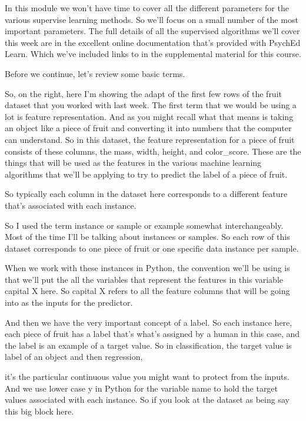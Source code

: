 \begin{multicols}{2}
In this module we won't have time to cover all the different parameters for the various supervise learning methods. So we'll focus on a small number of the most important parameters. The full details of all the supervised algorithms we'll cover this week are in the excellent online documentation that's provided with PsychEd Learn. Which we've included links to in the supplemental material for this course. 

Before we continue, let's review some basic terms. 

So, on the right, here I'm showing the adapt of the first few rows of the fruit dataset that you worked with last week. The first term that we would be using a lot is feature representation. And as you might recall what that means is taking an object like a piece of fruit and converting it into numbers that the computer can understand. So in this dataset, the feature representation for a piece of fruit consists of these columns, the mass, width, height, and color_score. These are the things that will be used as the features in the various machine learning algorithms that we'll be applying to try to predict the label of a piece of fruit. 

So typically each column in the dataset here corresponds to a different feature that's associated with each instance. 

So I used the term instance or sample or example somewhat interchangeably. Most of the time I'll be talking about instances or samples. So each row of this dataset corresponds to one piece of fruit or one specific data instance per sample. 

When we work with these instances in Python, the convention we'll be using is that we'll put the all the variables that represent the features in this variable capital X here. So capital X refers to all the feature columns that will be going into as the inputs for the predictor. 

And then we have the very important concept of a label. So each instance here, each piece of fruit has a label that's what's assigned by a human in this case, and the label is an example of a target value. So in classification, the target value is label of an object and then regression, 

it's the particular continuous value you might want to protect from the inputs. And we use lower case y in Python for the variable name to hold the target values associated with each instance. So if you look at the dataset as being say this big block here. 


\end{multicols}
